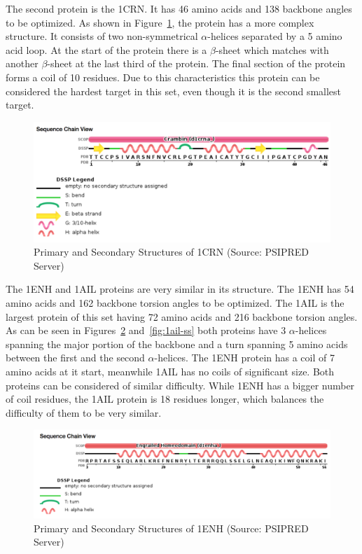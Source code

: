 The second protein is the 1CRN. It has 46 amino acids and 138 backbone angles
to be optimized. As shown in Figure~\ref{fig:1crn-ss}, the protein has a more
complex structure. It consists of two non-symmetrical $\alpha$-helices separated
by a 5 amino acid loop. At the start of the protein there is a $\beta$-sheet which
matches with another $\beta$-sheet at the last third of the protein. The
final section of the protein forms a coil of 10 residues. Due to
this characteristics this protein can be considered the hardest
target in this set, even though it is the second smallest target.

\begin{figure}[ht]
    \centering
    \includegraphics[scale=0.55]{Figuras/1crn-ss.png}
    \caption{Primary and Secondary Structures of 1CRN (Source: PSIPRED Server)}
    \label{fig:1crn-ss}
\end{figure}

The 1ENH and 1AIL proteins are very similar in its structure. The 1ENH has 54 amino acids and 162 backbone torsion angles to be optimized. The 1AIL is the largest protein of this set having 72 amino acids and 216 backbone torsion angles. As can be seen in Figures~\ref{fig:1enh-ss}
and~\ref{fig:1ail-ss} both proteins have 3 $\alpha$-helices spanning the major
portion of the backbone and a turn spanning 5 amino acids between the
first and the second $\alpha$-helices. The 1ENH protein has a coil
of 7 amino acids at it start, meanwhile 1AIL has no coils of significant size.
Both proteins can be considered of similar difficulty. While 1ENH has a bigger
number of coil residues, the 1AIL protein is 18 residues longer, which balances the difficulty of them to be very similar.

\begin{figure}[ht]
    \centering
    \includegraphics[scale=0.55]{Figuras/1enh-ss.png}
    \caption{Primary and Secondary Structures of 1ENH (Source: PSIPRED Server)}
    \label{fig:1enh-ss}
\end{figure}

